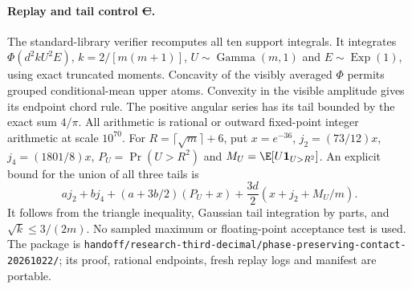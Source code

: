 \paragraph{Replay and tail control \st{C}.}
The standard-library verifier recomputes all ten support integrals.
It integrates $\Phi(d^2kU^2E)$, $k=2/[m(m+1)]$,
$U\sim\operatorname{Gamma}(m,1)$ and $E\sim\operatorname{Exp}(1)$,
using exact truncated moments. Concavity of the visibly averaged
$\Phi$ permits grouped conditional-mean upper atoms. Convexity in the
visible amplitude gives its endpoint chord rule. The positive angular
series has its tail bounded by the exact sum $4/\pi$. All arithmetic
is rational or outward fixed-point integer arithmetic at scale $10^{70}$.
For $R=\lceil\sqrt m\rceil+6$, put $x=e^{-36}$,
$j_2=(73/12)x$, $j_4=(1801/8)x$,
$P_U=\Pr(U>R^2)$ and $M_U=\E[U\mathbf1_{U>R^2}]$.
An explicit bound for the union of all three tails is
\[
 a j_2+b j_4+(a+3b/2)(P_U+x)
            +\frac{3d}{2}(x+j_2+M_U/m).
\]
It follows from the triangle inequality, Gaussian tail integration by
parts, and $\sqrt{k}\le3/(2m)$. No sampled maximum or floating-point
acceptance test is used. The package is
\texttt{handoff/research-third-decimal/phase-preserving-contact-20261022/};
its proof, rational endpoints, fresh replay logs and manifest are portable.

